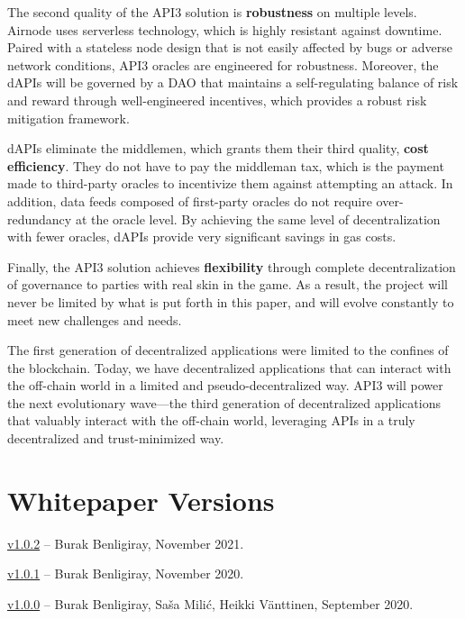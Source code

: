 \documentclass[11pt]{article}
\begin{document}
The second quality of the API3 solution is \textbf{robustness} on multiple levels.
Airnode uses serverless technology, which is highly resistant against downtime.
Paired with a stateless node design that is not easily affected by bugs or adverse network conditions, API3 oracles are engineered for robustness.
Moreover, the dAPIs will be governed by a DAO that maintains a self-regulating balance of risk and reward through well-engineered incentives, which provides a robust risk mitigation framework.

dAPIs eliminate the middlemen, which grants them their third quality, \textbf{cost efficiency}.
They do not have to pay the middleman tax, which is the payment made to third-party oracles to incentivize them against attempting an attack.
In addition, data feeds composed of first-party oracles do not require over-redundancy at the oracle level.
By achieving the same level of decentralization with fewer oracles, dAPIs provide very significant savings in gas costs.

Finally, the API3 solution achieves \textbf{flexibility} through complete decentralization of governance to parties with real skin in the game.
As a result, the project will never be limited by what is put forth in this paper, and will evolve constantly to meet new challenges and needs.

The first generation of decentralized applications were limited to the confines of the blockchain.
Today, we have decentralized applications that can interact with the off-chain world in a limited and pseudo-decentralized way.
API3 will power the next evolutionary wave---the third generation of decentralized applications that valuably interact with the off-chain world, leveraging APIs in a truly decentralized and trust-minimized way.

\small



\newpage
\normalsize
\appendix
\section{Whitepaper Versions}
\label{sec:versions}

\href{https://github.com/api3dao/api3-whitepaper/releases/tag/v1.0.2}{v1.0.2} -- Burak Benligiray, November 2021.

\href{https://github.com/api3dao/api3-whitepaper/releases/tag/v1.0.1}{v1.0.1} -- Burak Benligiray, November 2020.

\href{https://github.com/api3dao/api3-whitepaper/releases/tag/v1.0.0}{v1.0.0} -- Burak Benligiray, Sa\v{s}a Mili\'{c}, Heikki Vänttinen, September 2020.
\end{document}
